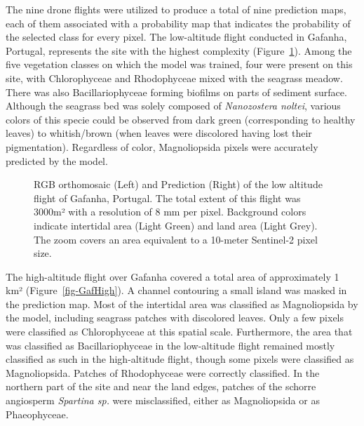 \documentclass[
  number]{elsarticle}
\begin{document}
The nine drone flights were utilized to produce a total of nine
prediction maps, each of them associated with a probability map that
indicates the probability of the selected class for every pixel. The
low-altitude flight conducted in Gafanha, Portugal, represents the site
with the highest complexity (Figure~\ref{fig-GafLow}). Among the five
vegetation classes on which the model was trained, four were present on
this site, with Chlorophyceae and Rhodophyceae mixed with the seagrass
meadow. There was also Bacillariophyceae forming biofilms on parts of
sediment surface. Although the seagrass bed was solely composed of
\emph{Nanozostera noltei}, various colors of this specie could be
observed from dark green (corresponding to healthy leaves) to
whitish/brown (when leaves were discolored having lost their
pigmentation). Regardless of color, Magnoliopsida pixels were accurately
predicted by the model.

\label{cell-fig-GafLow}
\begin{figure}[H]


\caption{\label{fig-GafLow}RGB orthomosaic (Left) and Prediction (Right)
of the low altitude flight of Gafanha, Portugal. The total extent of
this flight was 3000m² with a resolution of 8 mm per pixel. Background
colors indicate intertidal area (Light Green) and land area (Light
Grey). The zoom covers an area equivalent to a 10-meter Sentinel-2 pixel
size.}

\end{figure}%

The high-altitude flight over Gafanha covered a total area of
approximately 1 km² (Figure~\ref{fig-GafHigh}). A channel contouring a
small island was masked in the prediction map. Most of the intertidal
area was classified as Magnoliopsida by the model, including seagrass
patches with discolored leaves. Only a few pixels were classified as
Chlorophyceae at this spatial scale. Furthermore, the area that was
classified as Bacillariophyceae in the low-altitude flight remained
mostly classified as such in the high-altitude flight, though some
pixels were classified as Magnoliopsida. Patches of Rhodophyceae were
correctly classified. In the northern part of the site and near the land
edges, patches of the schorre angiosperm \emph{Spartina sp.} were
misclassified, either as Magnoliopsida or as Phaeophyceae.
\end{document}
